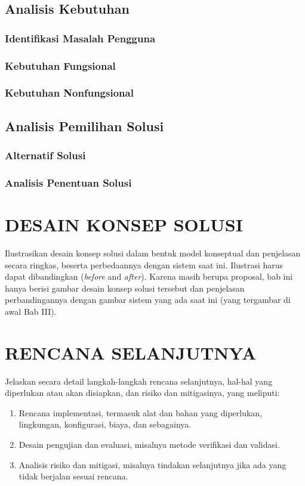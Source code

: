 \documentclass[12pt,a4paper,oneside]{book}
\begin{document}
\section{Analisis Kebutuhan}
\lipsum[4]
\subsection{Identifikasi Masalah Pengguna}
\lipsum[5]
\subsection{Kebutuhan Fungsional}
\lipsum[6]
\subsection{Kebutuhan Nonfungsional}
\lipsum[7]

\section{Analisis Pemilihan Solusi}
\subsection{Alternatif Solusi}
\lipsum[8]
\subsection{Analisis Penentuan Solusi}
\lipsum[9]

\chapter{DESAIN KONSEP SOLUSI}
Ilustrasikan desain konsep solusi dalam bentuk model konseptual dan penjelasan secara ringkas, 
beserta perbedaannya dengan sistem saat ini. Ilustrasi harus dapat dibandingkan (\textit{before} and \textit{after}). 
Karena masih berupa proposal, bab ini hanya berisi gambar desain konsep solusi tersebut dan 
penjelasan perbandingannya dengan gambar sistem yang ada saat ini (yang tergambar di awal Bab III).

\chapter{RENCANA SELANJUTNYA}
Jelaskan secara detail langkah-langkah rencana selanjutnya, hal-hal yang diperlukan atau akan disiapkan, dan risiko dan mitigasinya, yang meliputi:
\begin{enumerate}
\item	Rencana implementasi, termasuk alat dan bahan yang diperlukan, lingkungan, konfigurasi, biaya, dan sebagainya.
\item	Desain pengujian dan evaluasi, misalnya metode verifikasi dan validasi.
\item	Analisis risiko dan mitigasi, misalnya tindakan selanjutnya jika ada yang tidak berjalan sesuai rencana.
\end{enumerate}
\end{document}
